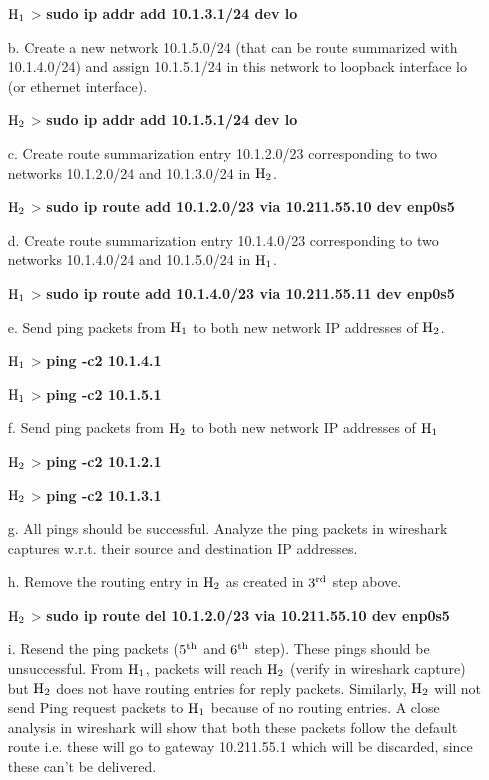 \begin{multicols}{2}
\begin{itemize}
${\rm H}_{1}$ > \textbf{sudo ip addr add 10.1.3.1/24 dev lo}

\item[b.] Create a new network 10.1.5.0/24 (that can be route summarized with 10.1.4.0/24) and assign 10.1.5.1/24 in this network to loopback interface lo (or ethernet interface).

${\rm H}_{2}$ > \textbf{sudo ip addr add 10.1.5.1/24 dev lo}

\item[c.] Create route summarization entry 10.1.2.0/23 corresponding to two networks 10.1.2.0/24 and 10.1.3.0/24 in ${\rm H}_{2}$.

${\rm H}_{2}$ > \textbf{sudo ip route add 10.1.2.0/23 via 10.211.55.10 dev enp0s5}

\item[d.] Create route summarization entry 10.1.4.0/23 corresponding to two networks 10.1.4.0/24 and 10.1.5.0/24 in ${\rm H}_{1}$.

${\rm H}_{1}$ > \textbf{sudo ip route add 10.1.4.0/23 via 10.211.55.11 dev enp0s5}

\item[e.] Send ping packets from ${\rm H}_{1}$ to both new network IP addresses of ${\rm H}_{2}$. 

${\rm H}_{1}$ > \textbf{ping -c2 10.1.4.1}

${\rm H}_{1}$ > \textbf{ping -c2 10.1.5.1}

\item[f.] Send ping packets from ${\rm H}_{2}$ to both new network IP addresses of ${\rm H}_{1}$

${\rm H}_{2}$  > \textbf{ping -c2 10.1.2.1}

${\rm H}_{2}$  > \textbf{ping -c2 10.1.3.1}

\item[g.] All pings should be successful. Analyze the ping packets in wireshark captures w.r.t. their source and destination IP addresses.

\item[h.] Remove the routing entry in ${\rm H}_{2}$ as created in $3^{\rm rd}$ step above.

${\rm H}_{2}$ > \textbf{sudo ip route del 10.1.2.0/23 via 10.211.55.10 dev enp0s5}

\item[i.] Resend the ping packets ($5^{\rm th}$ and $6^{\rm th}$ step). These pings should be unsuccessful. From ${\rm H}_{1}$, packets will reach ${\rm H}_{2}$ (verify in wireshark capture) but ${\rm H}_{2}$ does not have routing entries for reply packets.  Similarly, ${\rm H}_{2}$ will not send Ping request packets to ${\rm H}_{1}$ because of no routing entries. A close analysis in wireshark will show that both these packets follow the default route i.e. these will go to gateway 10.211.55.1 which will be discarded, since these can’t be delivered.
\end{itemize}


\end{multicols}
